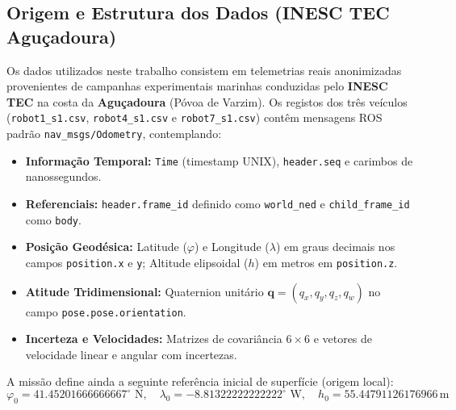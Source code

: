 \documentclass[11pt,a4paper]{article}
\begin{document}
\subsection{Origem e Estrutura dos Dados (INESC TEC Aguçadoura)}
Os dados utilizados neste trabalho consistem em telemetrias reais anonimizadas provenientes de campanhas experimentais marinhas conduzidas pelo \textbf{INESC TEC} na costa da \textbf{Aguçadoura} (Póvoa de Varzim). Os registos dos três veículos (\texttt{robot1\_s1.csv}, \texttt{robot4\_s1.csv} e \texttt{robot7\_s1.csv}) contêm mensagens ROS padrão \texttt{nav\_msgs/Odometry}, contemplando:
\begin{itemize}
    \item \textbf{Informação Temporal:} \texttt{Time} (timestamp UNIX), \texttt{header.seq} e carimbos de nanossegundos.
    \item \textbf{Referenciais:} \texttt{header.frame\_id} definido como \texttt{world\_ned} e \texttt{child\_frame\_id} como \texttt{body}.
    \item \textbf{Posição Geodésica:} Latitude ($\varphi$) e Longitude ($\lambda$) em graus decimais nos campos \texttt{position.x} e \texttt{y}; Altitude elipsoidal ($h$) em metros em \texttt{position.z}.
    \item \textbf{Atitude Tridimensional:} Quaternion unitário $\mathbf{q} = (q_x, q_y, q_z, q_w)$ no campo \texttt{pose.pose.}\allowbreak\texttt{orientation}.
    \item \textbf{Incerteza e Velocidades:} Matrizes de covariância $6 \times 6$ e vetores de velocidade linear e angular com incertezas.
\end{itemize}

A missão define ainda a seguinte referência inicial de superfície (origem local):
\begin{equation}
    \varphi_0 = 41.45201666666667^\circ\text{ N}, \quad \lambda_0 = -8.81322222222222^\circ\text{ W}, \quad h_0 = 55.44791126176966\,\text{m}
\end{equation}
\end{document}
